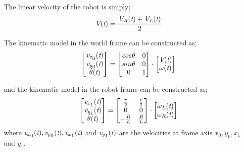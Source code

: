 The linear velocity of the robot is simply;
\begin{equation}
\textit{V}(\textit{t}) = \frac{\textit{V\textsubscript{R}}(\textit{t})+\textit{V\textsubscript{L}}(\textit{t})}{2}
\end{equation}

The kinematic model in the world frame can be constructed as;
\begin{equation}
\begin{bmatrix}
\textit{v}_{x\textsubscript{0}}(\textit{t})\\
\textit{v}_{y\textsubscript{0}}(\textit{t})\\
\dot{\theta}(\textit{t})
\end{bmatrix}=
\begin{bmatrix}
cos\theta & 0\\
sin\theta & 0\\
0         & 1
\end{bmatrix}\cdot
\begin{bmatrix}
\textit{V}(\textit{t})\\
\omega(\textit{t})\\
\end{bmatrix}
\end{equation} 

and the kinematic model in the robot frame can be constructed as;
\begin{equation}
\begin{bmatrix}
\textit{v}_{x\textsubscript{1}}(\textit{t})\\
\textit{v}_{y\textsubscript{1}}(\textit{t})\\
\dot{\theta}(\textit{t})
\end{bmatrix}=
\begin{bmatrix}
\frac{r}{2}  & \frac{r}{2}\\
0            & 0\\
-\frac{R}{L} & \frac{R}{L}
\end{bmatrix}\cdot
\begin{bmatrix}
\omega_{L}(\textit{t})\\
\omega_{R}(\textit{t})\\
\end{bmatrix}
\end{equation} 
where $\textit{v}_{x\textsubscript{0}}(\textit{t}),\textit{v}_{y\textsubscript{0}}(\textit{t}),\textit{v}_{x\textsubscript{1}}(\textit{t})$ and $\textit{v}_{y\textsubscript{1}}(\textit{t})$ are the velocities at frame axis $x_{0}, y_{0}, x_{1}$ and $y_{1}$.